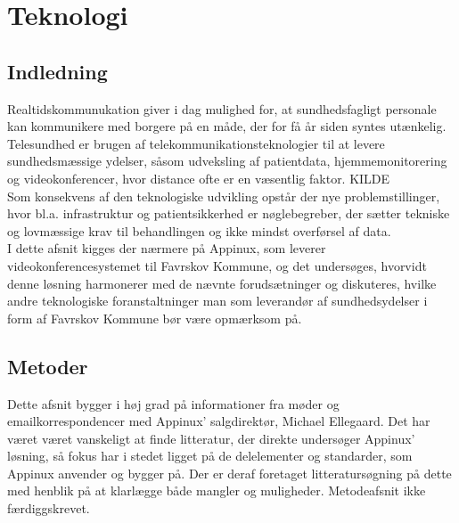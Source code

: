 \chapter{Teknologi}

\section{Indledning}

Realtidskommunukation giver i dag mulighed for, at sundhedsfagligt personale kan kommunikere med borgere på en måde, der for få år siden syntes utænkelig.
\\Telesundhed er brugen af telekommunikationsteknologier til at levere sundhedsmæssige ydelser, såsom udveksling af patientdata, hjemmemonitorering og videokonferencer, hvor distance ofte er en væsentlig faktor. KILDE\\
Som konsekvens af den teknologiske udvikling opstår der nye problemstillinger, hvor bl.a. infrastruktur og patientsikkerhed er nøglebegreber, der sætter tekniske og lovmæssige krav til behandlingen og ikke mindst overførsel af data.
\\
I dette afsnit kigges der nærmere på Appinux, som leverer videokonferencesystemet til Favrskov Kommune, og det undersøges, hvorvidt denne løsning harmonerer med de nævnte forudsætninger og diskuteres, hvilke andre teknologiske foranstaltninger man som leverandør af sundhedsydelser i form af Favrskov Kommune bør være opmærksom på.

\section{Metoder}
Dette afsnit bygger i høj grad på informationer fra møder og emailkorrespondencer med Appinux' salgdirektør, Michael Ellegaard. Det har været været vanskeligt at finde litteratur, der direkte undersøger Appinux' løsning, så fokus har i stedet ligget på de delelementer og standarder, som Appinux anvender og bygger på. Der er deraf foretaget litteratursøgning på dette med henblik på at klarlægge både mangler og muligheder.
Metodeafsnit ikke færdiggskrevet.

